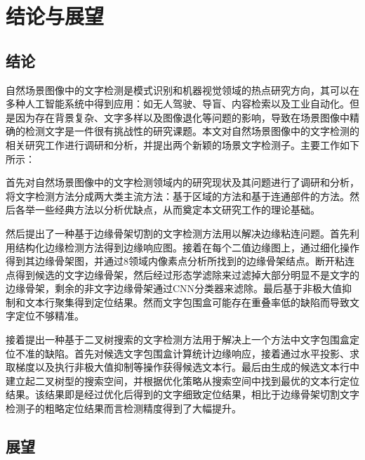 ﻿%
%
%
%
%
%
\chapter{结论与展望}

    \section{结论}
    
    自然场景图像中的文字检测是模式识别和机器视觉领域的热点研究方向，其可以在多种人工智能系统中得到应用：如无人驾驶、导盲、内容检索以及工业自动化。但是因为存在背景复杂、文字多样以及图像退化等问题的影响，导致在场景图像中精确的检测文字是一件很有挑战性的研究课题。本文对自然场景图像中的文字检测的相关研究工作进行调研和分析，并提出两个新颖的场景文字检测子。主要工作如下所示：
    
    首先对自然场景图像中的文字检测领域内的研究现状及其问题进行了调研和分析，将文字检测方法分成两大类主流方法：基于区域的方法和基于连通部件的方法。然后各举一些经典方法以分析优缺点，从而奠定本文研究工作的理论基础。
    
    然后提出了一种基于边缘骨架切割的文字检测方法用以解决边缘粘连问题。首先利用结构化边缘检测方法得到边缘响应图。接着在每个二值边缘图上，通过细化操作得到其边缘骨架图，并通过8领域内像素点分析所找到的边缘骨架结点。断开粘连点得到候选的文字边缘骨架，然后经过形态学滤除来过滤掉大部分明显不是文字的边缘骨架，剩余的非文字边缘骨架通过CNN分类器来滤除。最后基于非极大值抑制和文本行聚集得到定位结果。然而文字包围盒可能存在重叠率低的缺陷而导致文字定位不够精准。
    
    接着提出一种基于二叉树搜索的文字检测方法用于解决上一个方法中文字包围盒定位不准的缺陷。首先对候选文字包围盒计算统计边缘响应，接着通过水平投影、求取梯度以及执行非极大值抑制等操作获得候选文本行。最后由生成的候选文本行中建立起二叉树型的搜索空间，并根据优化策略从搜索空间中找到最优的文本行定位结果。该结果即是经过优化后得到的文字细致定位结果，相比于边缘骨架切割文字检测子的粗略定位结果而言检测精度得到了大幅提升。

    \section{展望}

